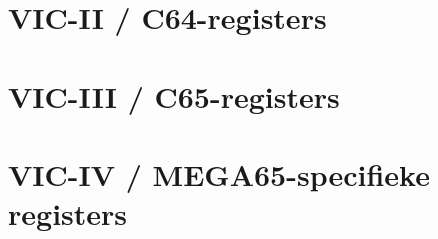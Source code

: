 \section{VIC-II / C64-registers}



\section{VIC-III / C65-registers}



\section{VIC-IV / MEGA65-specifieke registers}



